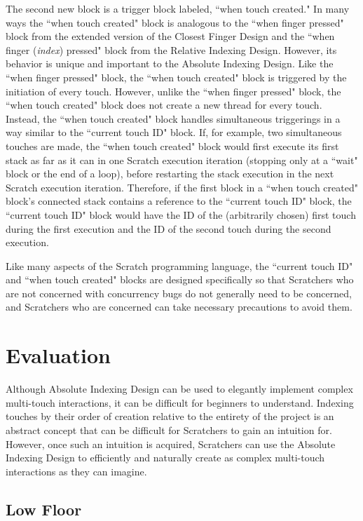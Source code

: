 The second new block is a trigger block labeled, ``when touch created." In many ways  the ``when touch created" block is analogous to the ``when finger pressed" block from the extended version of the Closest Finger Design and the ``when finger (\emph{index}) pressed" block from the Relative Indexing Design. However, its behavior is unique and important to the Absolute Indexing Design. Like the ``when finger pressed" block, the ``when touch created" block is triggered by the initiation of every touch. However, unlike the ``when finger pressed" block, the ``when touch created" block does not create a new thread for every touch. Instead, the ``when touch created" block handles simultaneous triggerings in a way similar to the ``current touch ID" block. If, for example, two simultaneous touches are made, the ``when touch created" block would first execute its first stack as far as it can in one Scratch execution iteration (stopping only at a ``wait" block or the end of a loop), before restarting the stack execution in the next Scratch execution iteration. Therefore, if the first block in a ``when touch created" block's connected stack contains a reference to the ``current touch ID" block, the ``current touch ID" block would have the ID of the (arbitrarily chosen) first touch during the first execution and the ID of the second touch during the second execution.

Like many aspects of the Scratch programming language, the ``current touch ID" and ``when touch created" blocks are designed specifically so that Scratchers who are not concerned with concurrency bugs do not generally need to be concerned, and Scratchers who are concerned can take necessary precautions to avoid them.

\section{Evaluation}

Although Absolute Indexing Design can be used to elegantly implement complex multi-touch interactions, it can be difficult for beginners to understand. Indexing touches by their order of creation relative to the entirety  of the project is an abstract concept that can be difficult for Scratchers to gain an intuition for. However, once such an intuition is acquired, Scratchers can use the Absolute Indexing Design to efficiently and naturally create as complex multi-touch interactions as they can imagine. 

\subsection{Low Floor}

